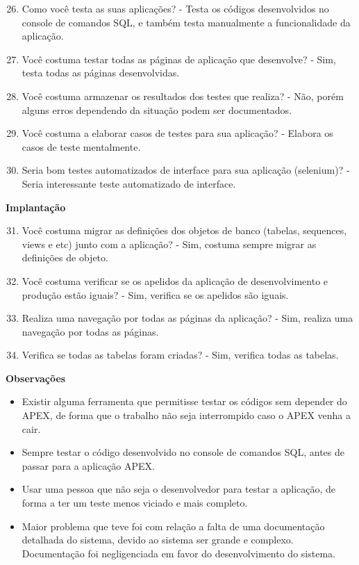 \begin{anexosenv}
\begin{enumerate}
\setcounter{enumi}{25}
\item Como você testa as suas aplicações?\newline
- Testa os códigos desenvolvidos no console de comandos SQL, e também testa manualmente a funcionalidade da aplicação.
\item Você costuma testar todas as páginas de aplicação que desenvolve?\newline
- Sim, testa todas as páginas desenvolvidas.
\item Você costuma armazenar os resultados dos testes que realiza?\newline
- Não, porém alguns erros dependendo da situação podem ser documentados.
\item Você costuma a elaborar casos de testes para sua aplicação?\newline
- Elabora os casos de teste mentalmente.
\item Seria bom testes automatizados de interface para sua aplicação (selenium)?\newline
- Seria interessante teste automatizado de interface.
\end{enumerate}

\textbf{Implantação}

\begin{enumerate}
\setcounter{enumi}{30}
\item Você costuma migrar as definições dos objetos de banco (tabelas, sequences, views e
etc) junto com a aplicação?\newline
- Sim, costuma sempre migrar as definições de objeto.
\item Você costuma verificar se os apelidos da aplicação de desenvolvimento e produção
estão iguais?\newline
- Sim, verifica se os apelidos são iguais.
\item Realiza uma navegação por todas as páginas da aplicação?\newline
- Sim, realiza uma navegação por todas as páginas.
\item Verifica se todas as tabelas foram criadas?\newline
- Sim, verifica todas as tabelas.
\end{enumerate}

\textbf{Observações}

\begin{itemize}
\item Existir alguma ferramenta que permitisse testar os códigos sem depender do APEX, de forma que o trabalho não seja interrompido caso o APEX venha a cair.
\item Sempre testar o código desenvolvido no console de comandos SQL, antes de passar para a aplicação APEX.
\item Usar uma pessoa que não seja o desenvolvedor para testar a aplicação, de forma a ter um teste menos viciado e mais completo.
\item Maior problema que teve foi com relação a falta de uma documentação detalhada do sistema, devido ao sistema ser grande e complexo. Documentação foi negligenciada em favor do desenvolvimento do sistema.
\end{itemize}


\end{anexosenv}
